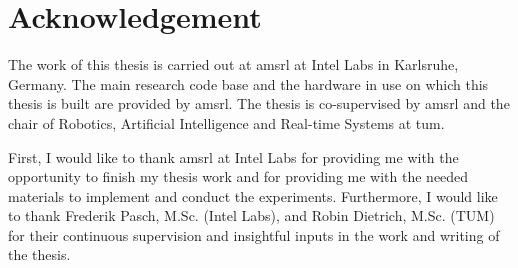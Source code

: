 \chapter{Acknowledgement}\label{ch:ackonwledgement}

The work of this thesis is carried out at \gls{amsrl} at Intel Labs in Karlsruhe, Germany. The main research code base and the hardware in use on which this thesis is built are provided by \gls{amsrl}. The thesis is co-supervised by \gls{amsrl} and the chair of Robotics, Artificial Intelligence and Real-time Systems at \gls{tum}. 


First, I would like to thank \gls{amsrl} at Intel Labs for providing me with the opportunity to finish my thesis work and for providing me with the needed materials to implement and conduct the experiments. Furthermore, I would like to thank Frederik Pasch, M.Sc. (Intel Labs), and Robin Dietrich, M.Sc. (TUM) for their continuous supervision and insightful inputs in the work and writing of the thesis.
